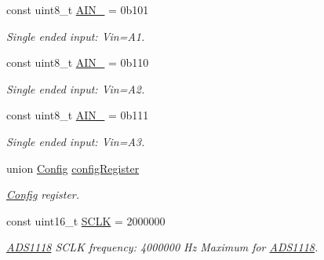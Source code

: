 \begin{DoxyCompactItemize}
\mbox{\label{class_a_d_s1118_a252939e56baf2c563a81778d36471b57}} 
const uint8\+\_\+t \mbox{\hyperlink{class_a_d_s1118_a252939e56baf2c563a81778d36471b57}{A\+I\+N\+\_}} = 0b101
\begin{DoxyCompactList}\small\item\em Single ended input\+: Vin=A1. \end{DoxyCompactList}\item 
\mbox{\label{class_a_d_s1118_ae54c53aaa6546ca3d6ff0a5f94bca2da}} 
const uint8\+\_\+t \mbox{\hyperlink{class_a_d_s1118_ae54c53aaa6546ca3d6ff0a5f94bca2da}{A\+I\+N\+\_}} = 0b110
\begin{DoxyCompactList}\small\item\em Single ended input\+: Vin=A2. \end{DoxyCompactList}\item 
\mbox{\label{class_a_d_s1118_a960aed37cacaba71cdc4d4761bce7fd4}} 
const uint8\+\_\+t \mbox{\hyperlink{class_a_d_s1118_a960aed37cacaba71cdc4d4761bce7fd4}{A\+I\+N\+\_}} = 0b111
\begin{DoxyCompactList}\small\item\em Single ended input\+: Vin=A3. \end{DoxyCompactList}\item 
\mbox{\label{class_a_d_s1118_ab41e0ba159527f2fc8d48cbedc653380}} 
union \mbox{\hyperlink{union_config}{Config}} \mbox{\hyperlink{class_a_d_s1118_ab41e0ba159527f2fc8d48cbedc653380}{config\+Register}}
\begin{DoxyCompactList}\small\item\em \mbox{\hyperlink{union_config}{Config}} register. \end{DoxyCompactList}\item 
\mbox{\label{class_a_d_s1118_a2e1f9b252a8468439c3c4a8b46ec5b9e}} 
const uint16\+\_\+t \mbox{\hyperlink{class_a_d_s1118_a2e1f9b252a8468439c3c4a8b46ec5b9e}{S\+C\+LK}} = 2000000
\begin{DoxyCompactList}\small\item\em \mbox{\hyperlink{class_a_d_s1118}{A\+D\+S1118}} S\+C\+LK frequency\+: 4000000 Hz Maximum for \mbox{\hyperlink{class_a_d_s1118}{A\+D\+S1118}}. \end{DoxyCompactList}\item 

\end{DoxyCompactItemize}
